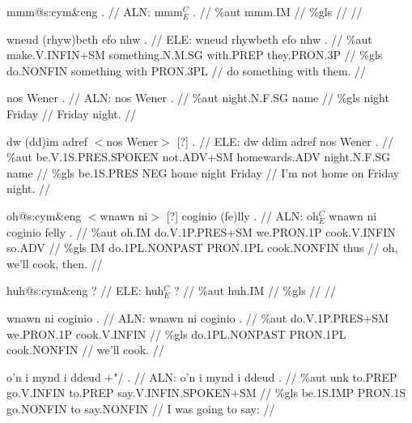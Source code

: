 \documentclass[a4paper,10pt]{article}
\begin{document}
\ex
\begingl[lingstyle=gergl]
\glchat mmm@s:cym\&eng . //
\glsurface ALN:  mmm$^{C}_{E}$ .  //
\glauto \%aut  mmm{\scriptsize .IM}   //
\glmanual \%gls     //
\gleng  //
\endgl
\xe

\ex
\begingl[lingstyle=gergl]
\glchat wneud (rhyw)beth efo nhw . //
\glsurface ELE:  wneud rhywbeth efo nhw .  //
\glauto \%aut  make{\scriptsize .V.INFIN+SM} something{\scriptsize .N.M.SG} with{\scriptsize .PREP} they{\scriptsize .PRON.3P}   //
\glmanual \%gls  do{\scriptsize .NONFIN} something with PRON{\scriptsize .3PL}   //
\gleng do something with them. //
\endgl
\xe

\ex
\begingl[lingstyle=gergl]
\glchat nos Wener . //
\glsurface ALN:  nos Wener .  //
\glauto \%aut  night{\scriptsize .N.F.SG} name   //
\glmanual \%gls  night Friday   //
\gleng Friday night. //
\endgl
\xe

\ex
\begingl[lingstyle=gergl]
\glchat dw (dd)im adref $<$nos Wener$>$ [?] . //
\glsurface ELE:  dw ddim adref nos Wener .  //
\glauto \%aut  be{\scriptsize .V.1S.PRES.SPOKEN} not{\scriptsize .ADV+SM} homewards{\scriptsize .ADV} night{\scriptsize .N.F.SG} name   //
\glmanual \%gls  be{\scriptsize .1S.PRES} NEG home night Friday   //
\gleng I'm not home on Friday night. //
\endgl
\xe

\ex
\begingl[lingstyle=gergl]
\glchat oh@s:cym\&eng $<$wnawn ni$>$ [?] coginio (fe)lly . //
\glsurface ALN:  oh$^{C}_{E}$ wnawn ni coginio felly .  //
\glauto \%aut  oh{\scriptsize .IM} do{\scriptsize .V.1P.PRES+SM} we{\scriptsize .PRON.1P} cook{\scriptsize .V.INFIN} so{\scriptsize .ADV}   //
\glmanual \%gls  IM do{\scriptsize .1PL.NONPAST} PRON{\scriptsize .1PL} cook{\scriptsize .NONFIN} thus   //
\gleng oh, we'll cook, then. //
\endgl
\xe

\ex
\begingl[lingstyle=gergl]
\glchat huh@s:cym\&eng ? //
\glsurface ELE:  huh$^{C}_{E}$ ?  //
\glauto \%aut  huh{\scriptsize .IM}   //
\glmanual \%gls     //
\gleng  //
\endgl
\xe

\ex
\begingl[lingstyle=gergl]
\glchat wnawn ni coginio . //
\glsurface ALN:  wnawn ni coginio .  //
\glauto \%aut  do{\scriptsize .V.1P.PRES+SM} we{\scriptsize .PRON.1P} cook{\scriptsize .V.INFIN}   //
\glmanual \%gls  do{\scriptsize .1PL.NONPAST} PRON{\scriptsize .1PL} cook{\scriptsize .NONFIN}   //
\gleng we'll cook. //
\endgl
\xe

\ex
\begingl[lingstyle=gergl]
\glchat o'n i mynd i ddeud +"/ . //
\glsurface ALN:  o'n i mynd i ddeud .  //
\glauto \%aut  unk to{\scriptsize .PREP} go{\scriptsize .V.INFIN} to{\scriptsize .PREP} say{\scriptsize .V.INFIN.SPOKEN+SM}   //
\glmanual \%gls  be{\scriptsize .1S.IMP} PRON{\scriptsize .1S} go{\scriptsize .NONFIN} to say{\scriptsize .NONFIN}   //
\gleng I was going to say: //
\endgl
\xe
\end{document}
